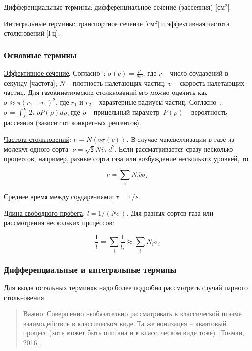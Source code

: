 \documentclass[10pt, a4paper]{article}
\numberwithin{equation}{section}
\newcommand{\Tokman}{~[Токман, 2016]}
\begin{document}
Дифференциальные термины: дифференциальное сечение (рассеяния) [см$^2$].

Интегральные термины: транспортное сечение [см$^2$] и эффективная частота столкновений [Гц].

\subsubsection{Основные термины}

\uline{Эффективное сечение}. Согласно~\cite{raizer}: $\sigma(v) = \frac{\nu}{Nv}$, где $\nu$ -- число соударений в секунду [частота]; $N$ -- плотность налетающих частиц; $v$ -- скорость налетающих частиц. Для газокинетических столкновений его можно оценить как $\sigma \approx \pi(r_1+r_2)^2$, где $r_1$ и $r_2$ -- характерные радиусы частиц. Согласно~\cite{astap}: $\sigma=\int_{0}^{\infty} 2\pi \rho P(\rho) d\rho$, где $\rho$ -- прицельный параметр, $P(\rho)$ -- вероятность рассеяния (зависит от конкретных реагентов). 

\uline{Частота столкновений}: $\nu = N\left\langle v\sigma(v)\right\rangle $. В случае максвеллизации в газе из молекул одного сорта: $\nu = \sqrt{2}N\overline{v}\pi d^2$. 
Если рассматривается сразу несколько процессов, например, разные сорта газа или возбуждение нескольких уровней, то

\begin{equation*}
	\nu = \sum_{i}N_i\overline{v}\sigma_i
\end{equation*}

\uline{Среднее время между соударениями}: $\tau = 1/\nu$.

\uline{Длина свободного пробега}: $l = 1/(N\sigma)$.
Для разных сортов газа или рассмотрения нескольких процессов:

\begin{equation*}
	\frac{1}{l} = \sum_{i}\frac{1}{l_i}\approx\sum_{i}N_i\sigma_i
\end{equation*}

\subsubsection{Дифференциальные и интегральные термины}

Для ввода остальных терминов надо более подробно рассмотреть случай парного столкновения.	

\begin{quotation}
	Важно: Совершенно необязательно рассматривать в классической плазме взаимодействие в классическом виде. Та же ионизация -- квантовый процесс (хоть может быть описана и в классическом виде тоже)\Tokman.
\end{quotation}
\end{document}
